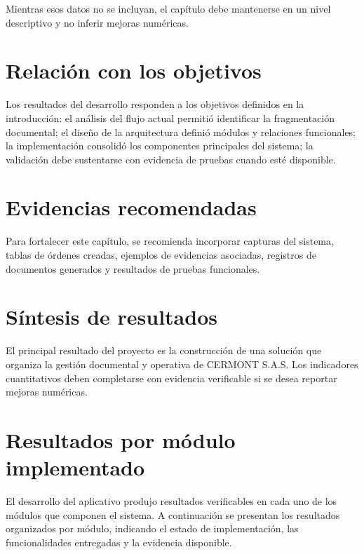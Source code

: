 Mientras esos datos no se incluyan, el capítulo debe mantenerse en un nivel descriptivo y no inferir mejoras numéricas.

\section{Relación con los objetivos}
\label{sec:relacion-objetivos-r}

Los resultados del desarrollo responden a los objetivos definidos en la introducción: el análisis del flujo actual permitió identificar la fragmentación documental; el diseño de la arquitectura definió módulos y relaciones funcionales; la implementación consolidó los componentes principales del sistema; la validación debe sustentarse con evidencia de pruebas cuando esté disponible.

\section{Evidencias recomendadas}
\label{sec:evidencias-recomendadas}

Para fortalecer este capítulo, se recomienda incorporar capturas del sistema, tablas de órdenes creadas, ejemplos de evidencias asociadas, registros de documentos generados y resultados de pruebas funcionales.

\section{Síntesis de resultados}
\label{sec:sintesis-resultados-c7}

El principal resultado del proyecto es la construcción de una solución que organiza la gestión documental y operativa de CERMONT S.A.S. Los indicadores cuantitativos deben completarse con evidencia verificable si se desea reportar mejoras numéricas.

\section{Resultados por módulo implementado}
\label{sec:resultados-por-modulo}

El desarrollo del aplicativo produjo resultados verificables en cada uno de los módulos que componen el sistema. A continuación se presentan los resultados organizados por módulo, indicando el estado de implementación, las funcionalidades entregadas y la evidencia disponible.

